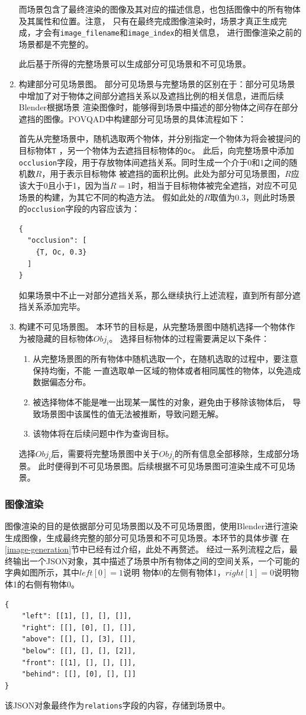 \begin{enumerate}[nosep]
而场景包含了最终渲染的图像及其对应的描述信息，也包括图像中的所有物体及其属性和位置。注意，
只有在最终完成图像渲染时，场景才真正生成完成，才会有\texttt{image\_filename}和\texttt{image\_index}的相关信息，
进行图像渲染之前的场景都是不完整的。

此后基于所得的完整场景可以生成部分可见场景和不可见场景。
\item 构建部分可见场景图。
部分可见场景与完整场景的区别在于：部分可见场景中增加了对于物体之间部分遮挡关系以及遮挡比例的相关信息，进而后续Blender根据场景
渲染图像时，能够得到场景中描述的部分物体之间存在部分遮挡的图像。POVQAD中构建部分可见场景的具体流程如下：

首先从完整场景中，随机选取两个物体，并分别指定一个物体为将会被提问的目标物体\texttt{T}
，另一个物体为去遮挡目标物体的\texttt{Oc}。
此后，向完整场景中添加\texttt{occlusion}字段，用于存放物体间遮挡关系。同时生成一个介于0和1之间的随机数$R$，用于表示目标物体
被遮挡的面积比例。此处为部分可见场景图，$R$应该大于0且小于1，因为当$R=1$时，相当于目标物体被完全遮挡，对应不可见场景的构建，为其它不同的构造方法。
假如此处的$R$取值为0.3，则此时场景的\texttt{occlusion}字段的内容应该为：
\begin{lstlisting}
{
  "occlusion": [
    {T, Oc, 0.3}
  ]
}
\end{lstlisting}
如果场景中不止一对部分遮挡关系，那么继续执行上述流程，直到所有部分遮挡关系添加完毕。
\item 构建不可见场景图。
本环节的目标是，从完整场景图中随机选择一个物体作为被隐藏的目标物体$Obj_i$。
选择目标物体的过程需要满足以下条件：
\begin{enumerate}[nosep]
\item 从完整场景图的所有物体中随机选取一个，在随机选取的过程中，要注意保持均衡，不能
一直选取单一区域的物体或者相同属性的物体，以免造成数据偏态分布。
\item 被选择物体不能是唯一出现某一属性的对象，避免由于移除该物体后，
导致场景图中该属性的值无法被推断，导致问题无解。
\item 该物体将在后续问题中作为查询目标。
\end{enumerate}

选择$Obj_i$后，需要将完整场景图中关于$Obj_i$的所有信息全部移除，生成部分场景。
此时便得到不可见场景图。后续根据不可见场景图可渲染生成不可见场景。
\end{enumerate}
\subsubsection{图像渲染}
图像渲染的目的是依据部分可见场景图以及不可见场景图，使用Blender进行渲染生成图像，生成最终完整的部分可见场景和不可见场景。本环节的具体步骤
在\ref{image-generation}节中已经有过介绍，此处不再赘述。
经过一系列流程之后，最终输出一个JSON对象，其中描述了场景中所有物体之间的空间关系，一个可能的字典如图所示，其中$left[0] = 1$说明
物体0的左侧有物体1，$right[1] = 0$说明物体1的右侧有物体0。
\begin{lstlisting}
{
    "left": [[1], [], [], []],
    "right": [[], [0], [], []],
    "above": [[], [], [3], []],
    "below": [[], [], [], [2]],
    "front": [[1], [], [], []],
    "behind": [[], [0], [], []]
}
\end{lstlisting}
该JSON对象最终作为\texttt{relations}字段的内容，存储到场景中。


